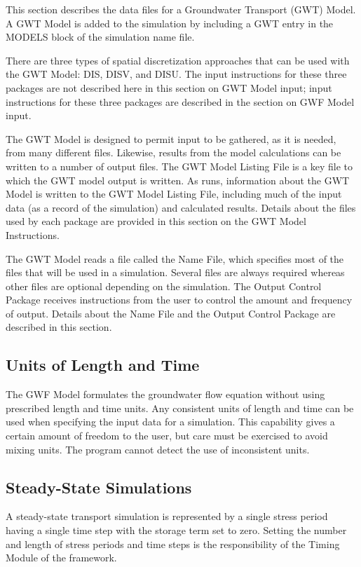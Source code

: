 This section describes the data files for a \mf Groundwater Transport (GWT) Model.  A GWT Model is added to the simulation by including a GWT entry in the MODELS block of the simulation name file.

There are three types of spatial discretization approaches that can be used with the GWT Model: DIS, DISV, and DISU.  The input instructions for these three packages are not described here in this section on GWT Model input; input instructions for these three packages are described in the section on GWF Model input.

The GWT Model is designed to permit input to be gathered, as it is needed, from many different files.  Likewise, results from the model calculations can be written to a number of output files. The GWT Model Listing File is a key file to which the GWT model output is written.  As \mf runs, information about the GWT Model is written to the GWT Model Listing File, including much of the input data (as a record of the simulation) and calculated results.  Details about the files used by each package are provided in this section on the GWT Model Instructions.

The GWT Model reads a file called the Name File, which specifies most of the files that will be used in a simulation. Several files are always required whereas other files are optional depending on the simulation. The Output Control Package receives instructions from the user to control the amount and frequency of output.  Details about the Name File and the Output Control Package are described in this section.

\subsection{Units of Length and Time}
The GWF Model formulates the groundwater flow equation without using prescribed length and time units. Any consistent units of length and time can be used when specifying the input data for a simulation. This capability gives a certain amount of freedom to the user, but care must be exercised to avoid mixing units.  The program cannot detect the use of inconsistent units.

\subsection{Steady-State Simulations}
A steady-state transport simulation is represented by a single stress period having a single time step with the storage term set to zero. Setting the number and length of stress periods and time steps is the responsibility of the Timing Module of the \mf framework.

